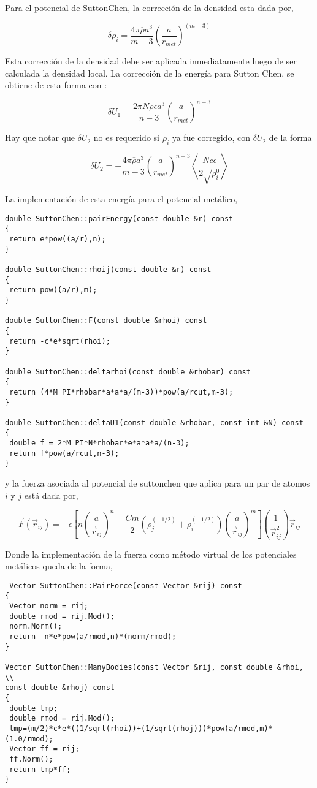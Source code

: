 Para el potencial de SuttonChen, la correcci\'on de la densidad esta dada por,

$$\delta\rho_i=\frac{4\pi\overline{\rho}a^3}{m-3}\left(\frac{a}{r_{met}}\right)^{(m-3)}$$

Esta correcci\'on de la densidad debe ser aplicada inmediatamente luego de ser calculada la densidad local. La correcci\'on de la energ\'ia para Sutton Chen, se obtiene de esta forma con :

$$\delta U_1 = \frac{2\pi N\overline{\rho}\epsilon a^3}{n-3}\left(\frac{a}{r_{met}}\right)^{n-3}$$

Hay que notar que $\delta U_2$ no es requerido si $\rho_i$ ya fue corregido, con $\delta U_2$ de la forma

$$\delta U_2 = -\frac{4\pi\overline{\rho}a^3}{m-3}\left(\frac{a}{r_{met}}\right)^{n-3}\left<\frac{Nc\epsilon}{2\sqrt{\rho_i^0}}\right>$$

La implementaci\'on de esta energ\'ia para el potencial met\'alico, 

\begin{verbatim}
double SuttonChen::pairEnergy(const double &r) const
{
 return e*pow((a/r),n);
}

double SuttonChen::rhoij(const double &r) const
{
 return pow((a/r),m);
}

double SuttonChen::F(const double &rhoi) const
{
 return -c*e*sqrt(rhoi);
}

double SuttonChen::deltarhoi(const double &rhobar) const
{
 return (4*M_PI*rhobar*a*a*a/(m-3))*pow(a/rcut,m-3);
}

double SuttonChen::deltaU1(const double &rhobar, const int &N) const
{
 double f = 2*M_PI*N*rhobar*e*a*a*a/(n-3);
 return f*pow(a/rcut,n-3);
}
\end{verbatim}

y la fuerza asociada al potencial de suttonchen que aplica para un par de atomos $i$ y $j$ est\'a dada por,

$$\vec{F}(\vec{r}_{ij}) = -\epsilon\left[n\left(\frac{a}{\vec{r}_{ij}}\right)^n - \frac{Cm}{2}(\rho_j^{(-1/2)}+\rho_i^{(-1/2)})\left(\frac{a}{\vec{r}_{ij}}\right)^m\right]\left(\frac{1}{\vec{r}_{ij}^2}\right)\vec{r}_{ij}$$

Donde la implementaci\'on de la fuerza como m\'etodo virtual de los potenciales met\'alicos queda de la forma,

\begin{verbatim}
 Vector SuttonChen::PairForce(const Vector &rij) const
{
 Vector norm = rij;
 double rmod = rij.Mod();
 norm.Norm();
 return -n*e*pow(a/rmod,n)*(norm/rmod);
}

Vector SuttonChen::ManyBodies(const Vector &rij, const double &rhoi, \\
const double &rhoj) const
{
 double tmp;
 double rmod = rij.Mod();
 tmp=(m/2)*c*e*((1/sqrt(rhoi))+(1/sqrt(rhoj)))*pow(a/rmod,m)*(1.0/rmod);
 Vector ff = rij;
 ff.Norm();
 return tmp*ff;
}
\end{verbatim}


